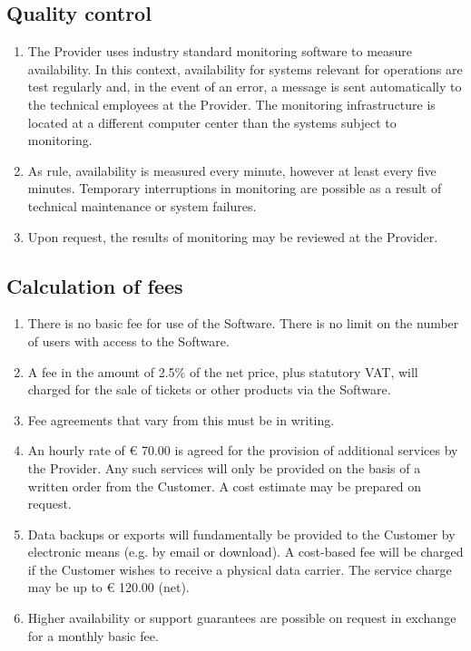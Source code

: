 \documentclass{terms}
\begin{document}
\subsection{Quality control}
\begin{enumerate}
\item The Provider uses industry standard monitoring software to measure availability. In this context, availability for systems relevant for operations are test regularly and, in the event of an error, a message is sent automatically to the technical employees at the Provider. The monitoring infrastructure is located at a different computer center than the systems subject to monitoring.
\item As rule, availability is measured every minute, however at least every five minutes. Temporary interruptions in monitoring are possible as a result of technical maintenance or system failures.
\item Upon request, the results of monitoring may be reviewed at the Provider.
\end{enumerate}

\subsection{Calculation of fees}
\begin{enumerate}
\item There is no basic fee for use of the Software. There is no limit on the number of users with access to the Software.
\item A fee in the amount of 2.5\% of the net price, plus statutory VAT, will charged for the sale of tickets or other products via the Software.
\item Fee agreements that vary from this must be in writing.
\item An hourly rate of € 70.00 is agreed for the provision of additional services by the Provider. Any such services will only be provided on the basis of a written order from the Customer. A cost estimate may be prepared on request.
\item Data backups or exports will fundamentally be provided to the Customer by electronic means (e.g. by email or download). A cost-based fee will be charged if the Customer wishes to receive a physical data carrier. The service charge may be up to € 120.00 (net).
\item Higher availability or support guarantees are possible on request in exchange for a monthly basic fee.
\end{enumerate}
\end{document}
